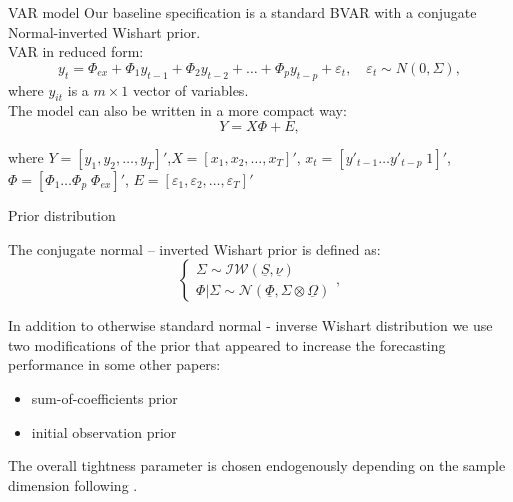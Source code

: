 \documentclass{beamer} %
\newcommand{\cN}{\mathcal{N}}
\newcommand{\cIW}{\mathcal{IW}}
\newcommand{\prior}{\underline}
\let\vec\relax
\DeclareMathOperator{\vec}{vec}
\begin{document}
\begin{frame}{VAR model}%
Our baseline specification is a standard BVAR with a conjugate Normal-inverted Wishart prior.\\
\vspace{5mm}
VAR in reduced form: 
\begin{equation}
y_t =\Phi_{ex}+ \Phi_1 y_{t-1} + \Phi_2 y_{t-2} +\ldots + \Phi_p y_{t-p} + \varepsilon_t,\quad \varepsilon_t\sim N(0,\Sigma), 
\end{equation}
where $y_{it}$ is  a  $m\times 1$ vector of variables.\\
\vspace{8mm}
The model can also be written in a more compact way: 
\begin{equation}
Y=X\Phi+E,\label{var}
\end{equation}

where $Y=[y_1, y_2,\ldots, y_T]'$,$X=[x_1, x_2,\ldots, x_T]'$, $x_t=[ y'_{t-1} \ldots  y'_{t-p} \; 1]'$,  $\Phi=[\Phi_1 \ldots \Phi_p \; \Phi_{ex}]'$, $E=[\varepsilon_1, \varepsilon_2,\ldots, \varepsilon_T]'$ 

\end{frame}%

\begin{frame}{Prior distribution}%

The conjugate normal -- inverted Wishart prior is defined as:
\begin{equation}
\begin{cases} 
\Sigma\sim \cIW(\prior S, \prior \nu) \\
\Phi | \Sigma \sim \cN (\prior\Phi, \Sigma \otimes \prior\Omega)
\end{cases},
\end{equation}

In addition to otherwise standard normal - inverse Wishart distribution we use two modifications of the prior that appeared to increase the forecasting performance in some other papers:
\begin{itemize}
\item sum-of-coefficients prior 
\item initial observation prior 
\end{itemize}
The overall tightness parameter is chosen endogenously depending on the sample dimension following \cite{banbura_al_2010}.
\end{frame}
\end{document}
